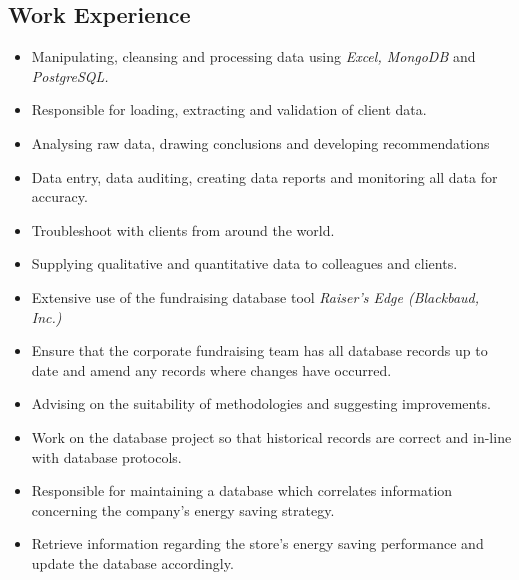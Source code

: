 \documentclass[11pt,a4paper,sans]{moderncv}
\begin{document}
\subsection{Work Experience}
\begin{itemize}
\item Manipulating, cleansing and processing data using \textit{Excel, MongoDB} and \textit{PostgreSQL.}
\item Responsible for loading, extracting and validation of client data.
\item Analysing raw data, drawing conclusions and developing recommendations
\item Data entry, data auditing, creating data reports and monitoring all data for accuracy.
\item Troubleshoot with clients from around the world.
\item Supplying qualitative and quantitative data to colleagues and clients.
\end{itemize}
\begin{itemize}
\item Extensive use of the fundraising database tool \textit{Raiser's Edge (Blackbaud, Inc.)}
\item Ensure that the corporate fundraising team has all database records up to date and amend any records where changes have occurred.
\item Advising on the suitability of methodologies and suggesting improvements.
\item Work on the database project so that historical records are correct and in-line with database protocols.
\end{itemize}
\begin{itemize}
\item Responsible for maintaining a database which correlates information concerning the company's energy saving strategy.
\item Retrieve information regarding the store's energy saving performance and update the database accordingly.
\end{itemize}
\newpage
{}
\end{document}
